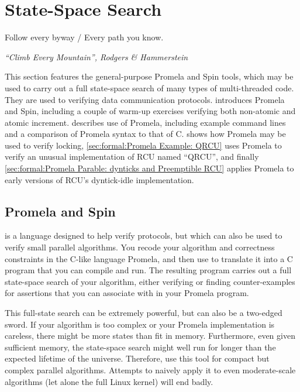 
\section{State-Space Search}
\label{sec:formal:State-Space Search}
%
\epigraph{Follow every byway / Every path you know.}
	 {\emph{``Climb Every Mountain'', Rodgers \& Hammerstein}}

This section features the general-purpose Promela and Spin tools,
which may be used to carry out a full
state-space search of many types of multi-threaded code.
They are used to verifying data communication protocols.
introduces Promela and Spin, including a couple of warm-up exercises
verifying both non-atomic and atomic increment.
describes use of Promela, including example command lines and a
comparison of Promela syntax to that of C\@.
shows how Promela may be used to verify locking,
\cref{sec:formal:Promela Example: QRCU}
uses Promela to verify an unusual implementation of RCU named ``QRCU'',
and finally
\cref{sec:formal:Promela Parable: dynticks and Preemptible RCU}
applies Promela to early versions of RCU's dyntick-idle implementation.

\subsection{Promela and Spin}
\label{sec:formal:Promela and Spin}

 is a language designed to help verify protocols, but which
can also be used to verify small parallel algorithms.
You recode your algorithm and correctness constraints in the C-like
language Promela, and then use  to translate it into a C program
that you can compile and run.
The resulting program carries out a full state-space search of your
algorithm, either verifying or finding counter-examples for
assertions that you can associate with in your Promela program.

This full-state search can be extremely powerful, but can also be a two-edged
sword.
If your algorithm is too complex or your Promela implementation is
careless, there might be more states than fit in memory.
Furthermore, even given sufficient memory, the state-space search might
well run for longer than the expected lifetime of the universe.
Therefore, use this tool for compact but complex parallel algorithms.
Attempts to naively apply it to even moderate-scale algorithms (let alone
the full Linux kernel) will end badly.

